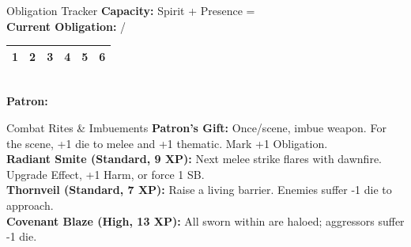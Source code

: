 \documentclass[10pt]{article}
\begin{document}
\begin{minipage}[t]{0.48\linewidth}
    \vspace{0.5em}
    
    \begin{charbox}{Obligation Tracker}
        \textbf{Capacity:} Spirit \underline{\hspace{1cm}} + Presence \underline{\hspace{1cm}} = \underline{\hspace{1.5cm}}\\
        \textbf{Current Obligation:} \underline{\hspace{1cm}} / \underline{\hspace{1.5cm}}\\
        \begin{tabular}{|p{1cm}|p{1cm}|p{1cm}|p{1cm}|p{1cm}|p{1cm}|}
            \hline
            1 & 2 & 3 & 4 & 5 & 6 \\
            \hline
        \end{tabular}\\
        \textbf{Patron:} \underline{\hspace{4cm}}
    \end{charbox}
    
    \vspace{0.5em}
    
    \begin{charbox}{Combat Rites \& Imbuements}
        \textbf{Patron's Gift:} Once/scene, imbue weapon. For the scene, +1 die to melee and +1 thematic. Mark +1 Obligation.\\
        \textbf{Radiant Smite (Standard, 9 XP):} Next melee strike flares with dawnfire. Upgrade Effect, +1 Harm, or force 1 SB.\\
        \textbf{Thornveil (Standard, 7 XP):} Raise a living barrier. Enemies suffer -1 die to approach.\\
        \textbf{Covenant Blaze (High, 13 XP):} All sworn within are haloed; aggressors suffer -1 die.
    \end{charbox}
\end{minipage}
\hfill
\end{document}
